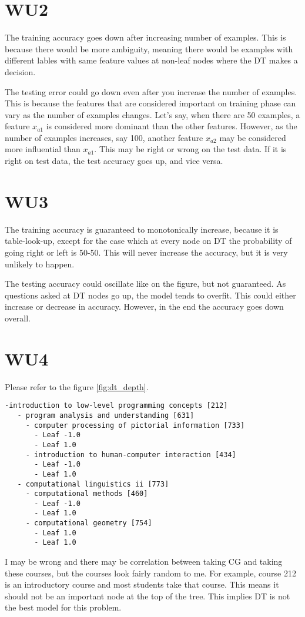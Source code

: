 \section*{WU2}
The training accuracy goes down after increasing number of examples. This is because there would be more ambiguity, meaning there would be examples with different lables with same feature values at non-leaf nodes where the DT makes a decision.

The testing error could go down even after you increase the number of examples. This is because the features that are considered important on training phase can vary as the number of examples changes. Let's say, when there are 50 examples, a feature $x_{a1}$ is considered more dominant than the other features. However, as the number of examples increases, say 100, another feature $x_{a2}$ may be considered more influential than $x_{a1}$. This may be right or wrong on the test data. If it is right on test data, the test accuracy goes up, and vice versa.

\section*{WU3}

The training accuracy is guaranteed to monotonically increase, because it is table-look-up, except for the case which at every node on DT the probability of going right or left is 50-50. This will never increase the accuracy, but it is very unlikely to happen. 

The testing accuracy could oscillate like on the figure, but not guaranteed. As questions asked at DT nodes go up, the model tends to overfit. This could either increase or decrease in accuracy. However, in the end the accuracy goes down overall.

\section*{WU4}

Please refer to the figure \ref{fig:dt_depth}.
  \begin{verbatim}
-introduction to low-level programming concepts [212]
   - program analysis and understanding [631]
     - computer processing of pictorial information [733]
       - Leaf -1.0
       - Leaf 1.0
     - introduction to human-computer interaction [434]
       - Leaf -1.0
       - Leaf 1.0
   - computational linguistics ii [773]
     - computational methods [460]
       - Leaf -1.0
       - Leaf 1.0
     - computational geometry [754]
       - Leaf 1.0
       - Leaf 1.0
  \end{verbatim}
I may be wrong and there may be correlation between taking CG and taking these courses, but the courses look fairly random to me. For example, course 212 is an introductory course and most students take that course. This means it should not be an important node at the top of the tree. This implies DT is not the best model for this problem.

